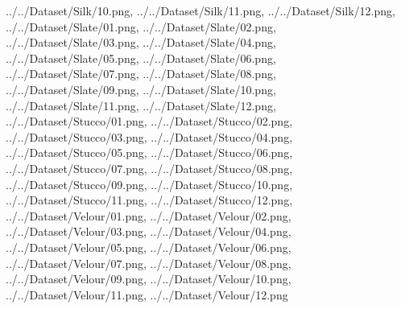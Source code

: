 {../../Dataset/Silk/10.png,
../../Dataset/Silk/11.png,
../../Dataset/Silk/12.png,
../../Dataset/Slate/01.png,
../../Dataset/Slate/02.png,
../../Dataset/Slate/03.png,
../../Dataset/Slate/04.png,
../../Dataset/Slate/05.png,
../../Dataset/Slate/06.png,
../../Dataset/Slate/07.png,
../../Dataset/Slate/08.png,
../../Dataset/Slate/09.png,
../../Dataset/Slate/10.png,
../../Dataset/Slate/11.png,
../../Dataset/Slate/12.png,
../../Dataset/Stucco/01.png,
../../Dataset/Stucco/02.png,
../../Dataset/Stucco/03.png,
../../Dataset/Stucco/04.png,
../../Dataset/Stucco/05.png,
../../Dataset/Stucco/06.png,
../../Dataset/Stucco/07.png,
../../Dataset/Stucco/08.png,
../../Dataset/Stucco/09.png,
../../Dataset/Stucco/10.png,
../../Dataset/Stucco/11.png,
../../Dataset/Stucco/12.png,
../../Dataset/Velour/01.png,
../../Dataset/Velour/02.png,
../../Dataset/Velour/03.png,
../../Dataset/Velour/04.png,
../../Dataset/Velour/05.png,
../../Dataset/Velour/06.png,
../../Dataset/Velour/07.png,
../../Dataset/Velour/08.png,
../../Dataset/Velour/09.png,
../../Dataset/Velour/10.png,
../../Dataset/Velour/11.png,
../../Dataset/Velour/12.png}